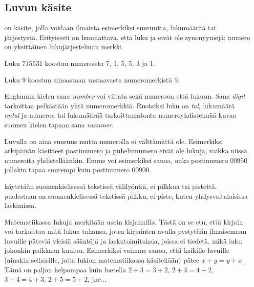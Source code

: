 


\subsection*{Luvun käsite}

 on käsite, jolla voidaan ilmaista esimerkiksi suuruutta, lukumäärää tai järjestystä. Erityisesti on huomattava, että
luku ja  eivät ole synonyymejä; numero on yksittäinen lukujärjestelmän merkki.

\begin{esimerkki}
	Luku $715531$ koostuu numeroista 7, 1, 5, 5, 3 ja 1.
	
	Luku $9$ koostuu ainoastaan vastaavasta numeromerkistä 9.
\end{esimerkki}

Englannin kielen sana \textit{number} voi viitata sekä numeroon että lukuun.
Sana \textit{digit} tarkoittaa pelkästään yhtä numeromerkkiä.
Ruotsiksi luku on \textit{tal}, lukumäärä \textit{antal} ja numeroa tai lukumäärää tarkoittamatonta
numeroyhdistelmää kuvaa suomen kielen tapaan sana \textit{nummer}.

Luvulla on aina suuruus mutta numerolla ei välttämättä ole. Esimerkiksi arkipäivän käsitteet
postinumero ja puhelinnumero eivät ole lukuja, vaikka niissä numeroita yhdistelläänkin. 
Emme voi esimerkiksi sanoa, onko postinumero 00950 jollakin tapaa suurempi kuin postinumero 00900.

 käytetään suomenkielisessä tekstissä välilyöntiä, ei pilkkua tai pistettä.
 puolestaan on suomenkielisessä tekstissä pilkku, ei piste, kuten yhdysvaltalaisissa laskimissa.

Matematiikassa lukuja merkitään usein kirjaimilla. Tästä on se etu, että kirjain voi tarkoittaa mitä lukua
tahansa, joten kirjainten avulla pystytään ilmaisemaan luvuille päteviä yleisiä sääntöjä ja laskutoimituksia, joissa ei
tiedetä, mikä luku johonkin paikkaan kuuluu. Esimerkiksi voimme sanoa, että kaikille luvuille
(ainakin sellaisille, joita lukion matematiikassa käsitellään) pätee $x+y=y+x$. Tämä on paljon helpompaa
kuin luetella $2+3=3+2$, $2+4=4+2$, $3+4=4+3$, $2+5=5+2$, jne...

